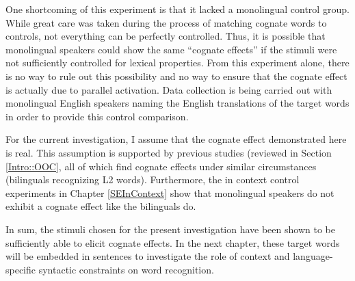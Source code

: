 
One shortcoming of this experiment is that it lacked a monolingual control group. While great care was taken during the process of matching cognate words to controls, not everything can be perfectly controlled. Thus, it is possible that monolingual speakers could show the same ``cognate effects'' if the stimuli were not sufficiently controlled for lexical properties.  From this experiment alone, there is no way to rule out this possibility and no way to ensure that the cognate effect is actually due to parallel activation. Data collection is being carried out with monolingual English speakers naming the English translations of the target words in order to provide this control comparison. 

For the current investigation, I assume that the cognate effect demonstrated here is real. This assumption is supported by previous studies (reviewed in Section \ref{Intro::OOC}, all of which find cognate effects under similar circumstances (bilinguals recognizing L2 words). Furthermore, the in context control experiments in Chapter \ref{SEInContext} show that monolingual speakers do not exhibit a cognate effect like the bilinguals do.

In sum, the stimuli chosen for the present investigation have been shown to be sufficiently able to elicit cognate effects. In the next chapter, these target words will be embedded in sentences to investigate the role of context and language-specific syntactic constraints on word recognition. 

